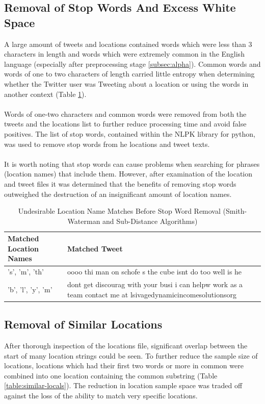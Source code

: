 \documentclass[11pt,a4paper]{article}
\begin{document}
\subsection{Removal of Stop Words And Excess White Space}
A large amount of tweets and locations contained words which were less than 3 characters in length and words which were extremely common in the English language (especially after preprocessing stage \ref{subsec:alpha}). Common words and words of one to two characters of length carried little entropy when determining whether the Twitter user was Tweeting about a location or using the words in another context (Table \ref{table:stop-words}).\\\\
Words of one-two characters and common words were removed from both the tweets and the locations list to further reduce processing time and avoid false positives. The list of stop words, contained within the NLPK library for python, was used to remove stop words from he locations and tweet texts.\\\\
It is worth noting that stop words can cause problems when searching for phrases (location names) that include them. However, after examination of the location and tweet files it was determined that the benefits of removing stop words outweighed the destruction of an insignificant amount of location names. 

\begin{table}[h]
	\centering
	\caption{Undesirable Location Name Matches Before Stop Word Removal (Smith-Waterman and Sub-Distance Algorithms)}
	\begin{tabular}{| l | p{10cm} |}
	\hline
	 \textbf{Matched Location Names} & \textbf{Matched Tweet}\\
	\hline
	's', 'm', 'th' & oooo thi man on schofe  s the cube isnt do too well is he\\
	\hline
	'b', 'l', 'y', 'm'  & dont get discourag with your busi i can helpw work as a team contact me at lsivagedynamicincomesolutionsorg\\
	\hline
	\end{tabular}
	\label{table:stop-words}
\end{table}

\subsection{Removal of Similar Locations}
After thorough inspection of the locations file, significant overlap between the start of many location strings could be seen. To further reduce the sample size of locations, locations which had their first two words or more in common were combined into one location containing the common substring (Table \ref{table:similar-locals}). The reduction in location sample space was traded off against the loss of the ability to match very specific locations.
\end{document}
